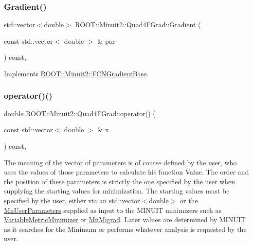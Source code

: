\mbox{\label{classROOT_1_1Minuit2_1_1Quad4FGrad_afd3b64a4236e31bdf9c330e33ac7ac89}} 
\subsubsection{\texorpdfstring{Gradient()}{Gradient()}\hspace{0.1cm}{\footnotesize\ttfamily [2/2]}}
{\footnotesize\ttfamily std\+::vector$<$double$>$ R\+O\+O\+T\+::\+Minuit2\+::\+Quad4\+F\+Grad\+::\+Gradient (\begin{DoxyParamCaption}\item[{const std\+::vector$<$ double $>$ \&}]{par }\end{DoxyParamCaption}) const\hspace{0.3cm}{\ttfamily [inline]}, {\ttfamily [virtual]}}



Implements \mbox{\hyperlink{classROOT_1_1Minuit2_1_1FCNGradientBase_a004740e7e25a1358aafde6694196ef88}{R\+O\+O\+T\+::\+Minuit2\+::\+F\+C\+N\+Gradient\+Base}}.

\mbox{\label{classROOT_1_1Minuit2_1_1Quad4FGrad_a8aaafaa9d7f974e27f5b54b30289dd6d}} 
\subsubsection{\texorpdfstring{operator()()}{operator()()}\hspace{0.1cm}{\footnotesize\ttfamily [1/2]}}
{\footnotesize\ttfamily double R\+O\+O\+T\+::\+Minuit2\+::\+Quad4\+F\+Grad\+::operator() (\begin{DoxyParamCaption}\item[{const std\+::vector$<$ double $>$ \&}]{x }\end{DoxyParamCaption}) const\hspace{0.3cm}{\ttfamily [inline]}, {\ttfamily [virtual]}}

The meaning of the vector of parameters is of course defined by the user, who uses the values of those parameters to calculate his function Value. The order and the position of these parameters is strictly the one specified by the user when supplying the starting values for minimization. The starting values must be specified by the user, either via an std\+::vector$<$double$>$ or the \mbox{\hyperlink{classROOT_1_1Minuit2_1_1MnUserParameters}{Mn\+User\+Parameters}} supplied as input to the M\+I\+N\+U\+IT minimizers such as \mbox{\hyperlink{classROOT_1_1Minuit2_1_1VariableMetricMinimizer}{Variable\+Metric\+Minimizer}} or \mbox{\hyperlink{classROOT_1_1Minuit2_1_1MnMigrad}{Mn\+Migrad}}. Later values are determined by M\+I\+N\+U\+IT as it searches for the Minimum or performs whatever analysis is requested by the user.



